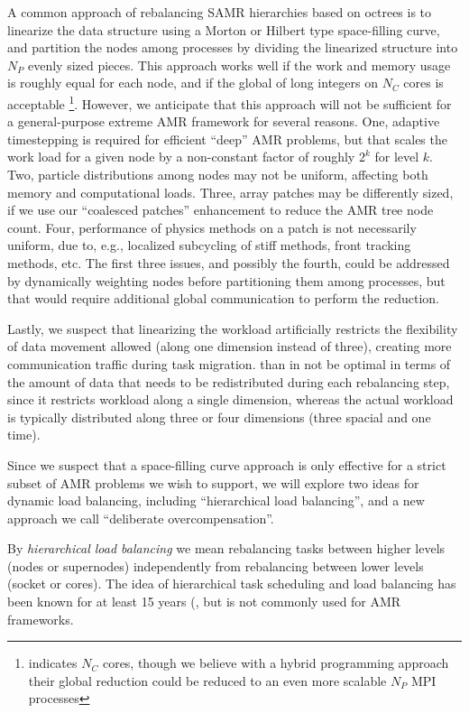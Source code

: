 \documentclass[14pt,letter]{article}
\begin{document}
A common approach of rebalancing SAMR hierarchies based on octrees is
to linearize the data structure using a Morton or Hilbert type
space-filling curve, and partition the nodes among processes by
dividing the linearized structure into $N_P$ evenly sized pieces.
This approach works well if the work and memory usage is roughly equal
for each node, and if the global  of long
integers on $N_C$ cores is acceptable \footnote{\cite{BuGh08}
  indicates $N_C$ cores, though we believe with a hybrid programming
  approach their global reduction could be reduced to an even more
  scalable $N_P$ MPI processes}.  However, we anticipate that this
approach will not be sufficient for a general-purpose extreme AMR
framework for several reasons.
%
One, adaptive timestepping is required for efficient ``deep'' AMR
problems, but that scales the work load for a given node by a
non-constant factor of roughly $2^k$ for level $k$.
%
Two, particle distributions among nodes may not be uniform, affecting both memory and computational loads.
%
Three, array patches may be differently sized, if we use our ``coalesced patches'' enhancement to reduce the AMR tree node count.  
%
Four, performance of physics methods on a patch is not necessarily
uniform, due to, e.g., localized subcycling of stiff methods, front
tracking methods, etc.  The first three issues, and possibly the
fourth, could be addressed by dynamically weighting nodes before
partitioning them among processes, but that would require additional
global communication to perform the reduction.
%

Lastly, we suspect that linearizing the workload artificially
restricts the flexibility of data movement allowed (along one
dimension instead of three), creating more communication traffic
during task migration.  than in not be optimal in terms of the amount
of data that needs to be redistributed during each rebalancing step,
since it restricts workload along a single dimension, whereas the
actual workload is typically distributed along three or four
dimensions (three spacial and one time).

Since we suspect that a space-filling curve approach is only effective
for a strict subset of AMR problems we wish to support, we will
explore two ideas for dynamic load balancing, including ``hierarchical
load balancing'', and a new approach we call ``deliberate
overcompensation''.

 By \textit{hierarchical load
  balancing} we mean rebalancing tasks between higher levels (nodes or
supernodes) independently from rebalancing between lower levels
(socket or cores).  The idea of hierarchical task scheduling and load
balancing has been known for at least 15 years (\cite{AhGh94}, but is
not commonly used for AMR frameworks.
\end{document}
